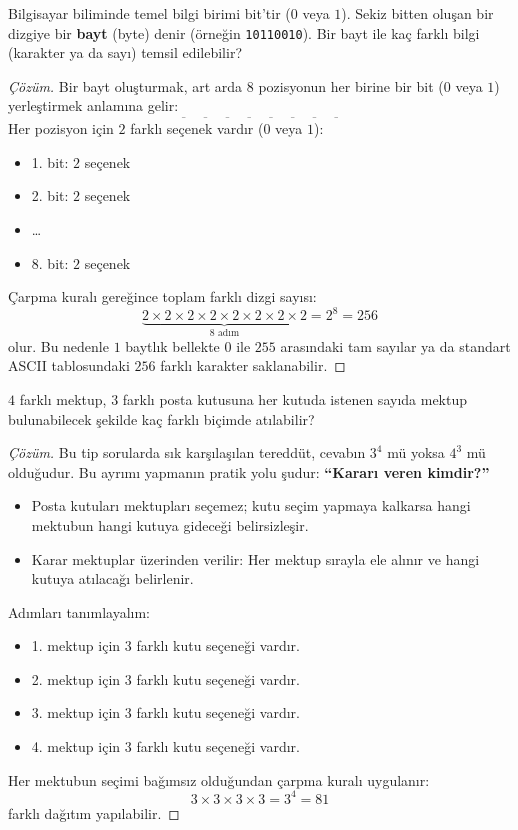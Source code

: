 \begin{example}
Bilgisayar biliminde temel bilgi birimi bit'tir ($0$ veya $1$). Sekiz bitten oluşan bir dizgiye bir \textbf{bayt} (byte) denir (örneğin \texttt{10110010}). Bir bayt ile kaç farklı bilgi (karakter ya da sayı) temsil edilebilir?
\end{example}
\begin{proof}[Çözüm]
Bir bayt oluşturmak, art arda $8$ pozisyonun her birine bir bit ($0$ veya $1$) yerleştirmek anlamına gelir:
\[ \overline{\quad} \;\; \overline{\quad} \;\; \overline{\quad} \;\; \overline{\quad} \;\; \overline{\quad} \;\; \overline{\quad} \;\; \overline{\quad} \;\; \overline{\quad} \]
Her pozisyon için $2$ farklı seçenek vardır ($0$ veya $1$):
\begin{itemize}
  \item 1. bit: $2$ seçenek
  \item 2. bit: $2$ seçenek
  \item \dots
  \item 8. bit: $2$ seçenek
\end{itemize}
Çarpma kuralı gereğince toplam farklı dizgi sayısı:
\[ \underbrace{2 \times 2 \times 2 \times 2 \times 2 \times 2 \times 2 \times 2}_{8 \text{ adım}} = 2^8 = 256 \]
olur. Bu nedenle $1$ baytlık bellekte $0$ ile $255$ arasındaki tam sayılar ya da standart ASCII tablosundaki $256$ farklı karakter saklanabilir.
\end{proof}

\begin{example}
$4$ farklı mektup, $3$ farklı posta kutusuna her kutuda istenen sayıda mektup bulunabilecek şekilde kaç farklı biçimde atılabilir?
\end{example}
\begin{proof}[Çözüm]
Bu tip sorularda sık karşılaşılan tereddüt, cevabın $3^4$ mü yoksa $4^3$ mü olduğudur. Bu ayrımı yapmanın pratik yolu şudur: \textbf{``Kararı veren kimdir?''}
\begin{itemize}
  \item Posta kutuları mektupları seçemez; kutu seçim yapmaya kalkarsa hangi mektubun hangi kutuya gideceği belirsizleşir.
  \item Karar mektuplar üzerinden verilir: Her mektup sırayla ele alınır ve hangi kutuya atılacağı belirlenir.
\end{itemize}
Adımları tanımlayalım:
\begin{itemize}
  \item 1. mektup için $3$ farklı kutu seçeneği vardır.
  \item 2. mektup için $3$ farklı kutu seçeneği vardır.
  \item 3. mektup için $3$ farklı kutu seçeneği vardır.
  \item 4. mektup için $3$ farklı kutu seçeneği vardır.
\end{itemize}
Her mektubun seçimi bağımsız olduğundan çarpma kuralı uygulanır:
\[ 3 \times 3 \times 3 \times 3 = 3^4 = 81 \]
farklı dağıtım yapılabilir.
\end{proof}

